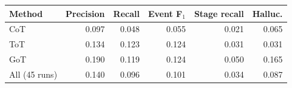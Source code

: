\begin{tabular}{@{}lrrrrr@{}}\toprule
Method & Precision & Recall & Event F$_1$ & Stage recall & Halluc.\\\midrule
CoT & 0.097 & 0.048 & 0.055 & 0.021 & 0.065\\
ToT & 0.134 & 0.123 & 0.124 & 0.031 & 0.031\\
GoT & 0.190 & 0.119 & 0.124 & 0.050 & 0.165\\
\midrule
All (45 runs) & 0.140 & 0.096 & 0.101 & 0.034 & 0.087\\
\bottomrule\end{tabular}
